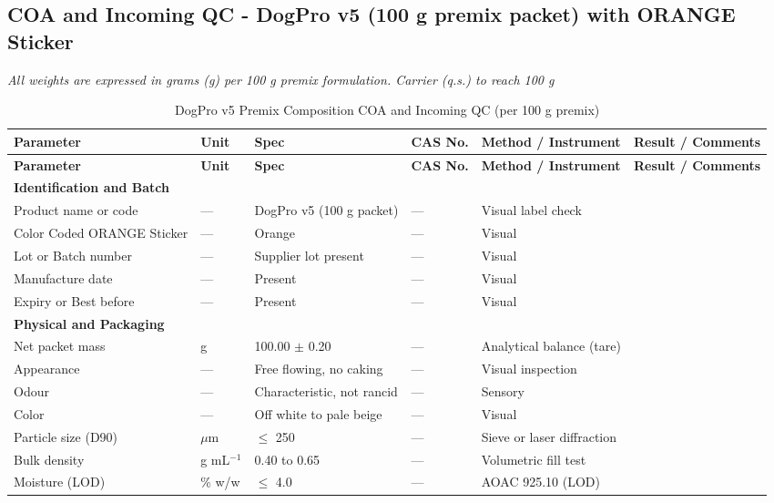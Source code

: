 
\subsection*{COA and Incoming QC - DogPro v5 (100 g premix packet) with ORANGE Sticker}
\noindent\textit{All weights are expressed in grams (g) per 100 g premix formulation. Carrier (q.s.) to reach 100 g}
\begin{longtable}{@{}p{6.0cm}p{1.5cm}p{1.8cm}p{2.0cm}p{3.0cm}p{3.0cm}@{}}
\caption{DogPro v5 Premix Composition COA and Incoming QC (per 100 g premix)}\\
\toprule
\textbf{Parameter} & \textbf{Unit} & \textbf{Spec} & \textbf{CAS No.} & \textbf{Method / Instrument} & \textbf{Result / Comments} \\
\midrule
\endfirsthead
\toprule
\textbf{Parameter} & \textbf{Unit} & \textbf{Spec} & \textbf{CAS No.} & \textbf{Method / Instrument} & \textbf{Result / Comments} \\
\midrule
\endhead

\multicolumn{6}{l}{\textbf{Identification and Batch}} \\[3pt]
Product name or code & --- & DogPro v5 (100 g packet) & --- & Visual label check & \\[3pt]
Color Coded ORANGE Sticker & --- & Orange & --- & Visual & \\[3pt]
Lot or Batch number & --- & Supplier lot present & --- & Visual & \\[3pt]
Manufacture date & --- & Present & --- & Visual & \\[3pt]
Expiry or Best before & --- & Present & --- & Visual & \\[6pt]

\multicolumn{6}{l}{\textbf{Physical and Packaging}} \\[3pt]
Net packet mass & g & 100.00 $\pm$ 0.20 & --- & Analytical balance (tare) & \\[3pt]
Appearance & --- & Free flowing, no caking & --- & Visual inspection & \\[3pt]
Odour & --- & Characteristic, not rancid & --- & Sensory & \\[3pt]
Color & --- & Off white to pale beige & --- & Visual & \\[3pt]
Particle size (D90) & $\mu$m & $\le$ 250 & --- & Sieve or laser diffraction & \\[3pt]
Bulk density & g mL$^{-1}$ & 0.40 to 0.65 & --- & Volumetric fill test & \\[3pt]
Moisture (LOD) & \% w/w & $\le$ 4.0 & --- & AOAC 925.10 (LOD) & \\[6pt]


\end{longtable}
